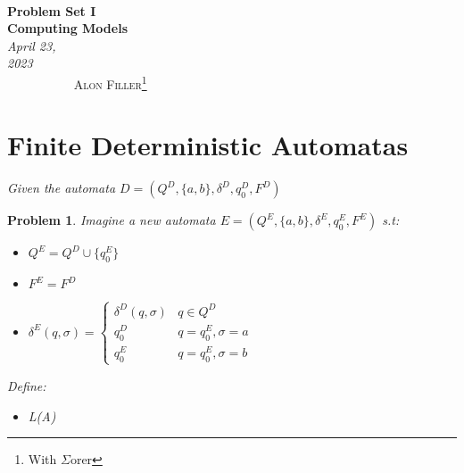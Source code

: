 \documentclass[12pt]{article}
\renewcommand{\=}[1]{\stackrel{#1}{=}} %
\newtheorem{p}{Problem}[section]
\theoremstyle{definition}
\begin{document}
{\noindent\Huge\bf  \\[0.5\baselineskip] {\selectfont  Problem Set I}         }\\[2\baselineskip] %
{ {\bf {}\selectfont Computing Models}\\ {\textit{\selectfont     April 23, 2023}}}~~~~~~~~~~~~~~~~~~~~~~~~~~~~~~~~~~~~~~~~~~~~~~~~~~~~~~~~~~~~~~~~~~~~~~~~~~~~~    {\large \textsc{Alon Filler}\footnote{With $\Sigma$orer}} %
\\[1.4\baselineskip] 



\section{Finite Deterministic Automatas}
\emph{Given the automata $D = (Q^{D}, \{a,b\}, \delta^{D}, q_0^{D}, F^{D})$} \newline
\begin{p}
\emph{\newline Imagine a new automata $E = (Q^{E}, \{a,b\}, \delta^{E}, q_0^{E}, F^{E})$} s.t:
\begin{itemize}
  \item $Q^{E} = Q^{D} \cup \{q_0^{E}\}$
  \item $F^{E} = F^{D}$
  \item \(
    \delta^{E}(q, \sigma) = 
    \begin{cases}
      \delta^{D}(q, \sigma) & q \in Q^{D} \\
        q_0^{D} & q = q_0^{E}, \sigma = a \\ 
        q_0^{E} & q = q_0^{E}, \sigma = b
    \end{cases}
  \)
\end{itemize}

Define: 
\begin{itemize}
  \item L(A)
\end{itemize}
\end{p}
\end{document}
